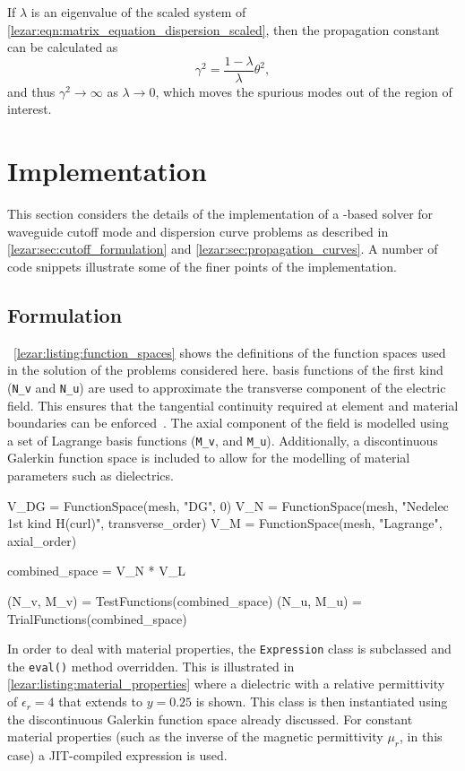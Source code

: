 If $\lambda$ is an eigenvalue of the scaled system of
\eqref{lezar:eqn:matrix_equation_dispersion_scaled}, then the propagation constant can be
calculated as
\begin{equation}
    \gamma^2 = \frac{1 - \lambda}{\lambda}\theta^2,
\end{equation}
and thus $\gamma^2 \rightarrow \infty$ as $\lambda \rightarrow 0$, which moves the spurious modes out of the region of interest.

\section{Implementation}
\label{lezar:sec:Implementation}

This section considers the details of the implementation of
a \fenics-based solver for waveguide cutoff mode and dispersion curve
problems as described in \ref{lezar:sec:cutoff_formulation}
and \ref{lezar:sec:propagation_curves}. A number of code snippets
illustrate some of the finer points of the implementation.

\subsection{Formulation}
\lstlistingname{}~\ref{lezar:listing:function_spaces} shows the definitions of the function spaces used in the solution of the problems considered here. \nedelec{} basis functions of the first kind ({\tt N\_v} and {\tt N\_u}) are used to approximate the transverse component of the electric field. This ensures that the tangential continuity required at element and material boundaries can be enforced~\cite{Jin2002}.  The axial component of the field is modelled using a set of Lagrange basis functions ({\tt M\_v}, and {\tt M\_u}). Additionally, a discontinuous Galerkin function space is included to allow for the modelling of material parameters such as dielectrics.
\begin{python}
V_DG = FunctionSpace(mesh, "DG", 0)
V_N = FunctionSpace(mesh, "Nedelec 1st kind H(curl)", transverse_order)
V_M = FunctionSpace(mesh, "Lagrange", axial_order)

combined_space = V_N * V_L

(N_v, M_v) = TestFunctions(combined_space)
(N_u, M_u) = TrialFunctions(combined_space)
\end{python}

In order to deal with material properties, the {\tt Expression} class is
subclassed and the {\tt eval()} method overridden. This is illustrated
in \lstlistingname{} \ref{lezar:listing:material_properties} where a
dielectric with a relative permittivity of $\epsilon_r = 4$ that extends to
$y = 0.25$ is shown. This class is then instantiated using the
discontinuous Galerkin function space already discussed. For constant
material properties (such as the inverse of the magnetic permittivity
$\mu_r$, in this case) a JIT-compiled expression is used.

